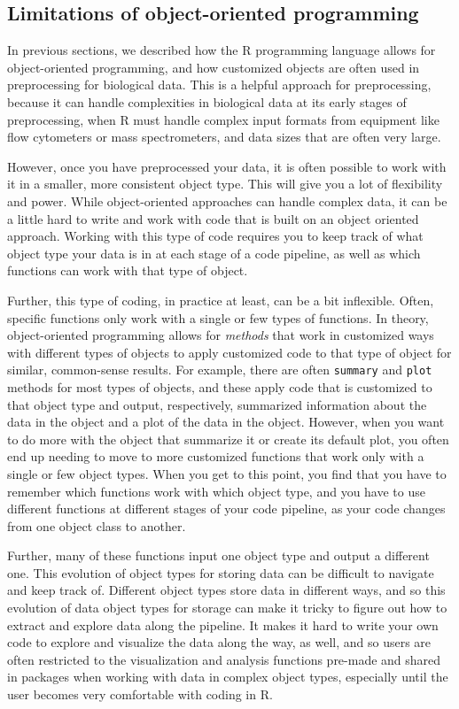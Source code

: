 \documentclass[]{tufte-book}
\begin{document}
\hypertarget{limitations-of-object-oriented-programming}{%
\subsection{Limitations of object-oriented programming}\label{limitations-of-object-oriented-programming}}

In previous sections, we described how the R programming language allows for
object-oriented programming, and how customized objects are often used in
preprocessing for biological data. This is a helpful approach for preprocessing,
because it can handle complexities in biological data at its early stages of
preprocessing, when R must handle complex input formats from equipment like
flow cytometers or mass spectrometers, and data sizes that are often very large.

However, once you have preprocessed your data, it is often possible to work with it
in a smaller, more consistent object type. This will give you a lot of flexibility
and power. While object-oriented approaches can handle complex data, it can be a
little hard to write and work with code that is built on an object oriented approach.
Working with this type of code requires you to keep track of what object type your
data is in at each stage of a code pipeline, as well as which functions can work with
that type of object.

Further, this type of coding, in practice at least, can be a bit inflexible.
Often, specific functions only work with a single or few types of functions. In
theory, object-oriented programming allows for \emph{methods} that work in customized
ways with different types of objects to apply customized code to that type of
object for similar, common-sense results. For example, there are often \texttt{summary}
and \texttt{plot} methods for most types of objects, and these apply code that is
customized to that object type and output, respectively, summarized information
about the data in the object and a plot of the data in the object. However, when
you want to do more with the object that summarize it or create its default
plot, you often end up needing to move to more customized functions that work
only with a single or few object types. When you get to this point, you find that
you have to remember which functions work with which object type, and you have to
use different functions at different stages of your code pipeline, as your code
changes from one object class to another.

Further, many of these functions input one object type and output a different
one. This evolution of object types for storing data can be difficult to navigate
and keep track of. Different object types store data in different ways, and so
this evolution of data object types for storage can make it tricky to figure out
how to extract and explore data along the pipeline. It makes it hard to write your
own code to explore and visualize the data along the way, as well, and so users
are often restricted to the visualization and analysis functions pre-made and
shared in packages when working with data in complex object types, especially
until the user becomes very comfortable with coding in R.
\end{document}
